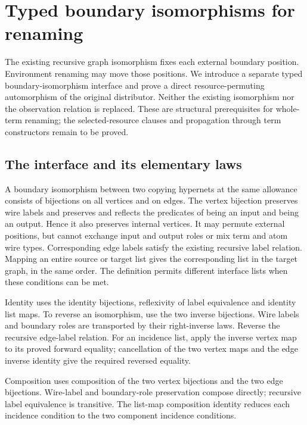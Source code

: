 \clearpage
\section{Typed boundary isomorphisms for renaming}
\label{sec:copying-boundary-iso}
The existing recursive graph isomorphism fixes each external boundary position.
Environment renaming may move those positions. We introduce a separate typed
boundary-isomorphism interface and prove a direct resource-permuting
automorphism of the original distributor. Neither the existing isomorphism nor
the observation relation is replaced. These are structural prerequisites for
whole-term renaming; the selected-resource clauses and propagation through
term constructors remain to be proved.

\subsection{The interface and its elementary laws}
A boundary isomorphism between two copying hypernets at the same allowance
consists of bijections on all vertices and on edges. The vertex bijection
preserves wire labels and preserves and reflects the predicates of being an
input and being an output. Hence it also preserves internal vertices. It may
permute external positions, but cannot exchange input and output roles or
mix term and atom wire types. Corresponding edge labels satisfy the existing
recursive label relation. Mapping an entire source or target list gives the
corresponding list in the target graph, in the same order. The definition
permits different interface lists when these conditions can be met.

Identity uses the identity bijections, reflexivity of label equivalence and
identity list maps. To reverse an isomorphism, use the two inverse bijections.
Wire labels and boundary roles are transported by their right-inverse laws.
Reverse the recursive edge-label relation. For an incidence list, apply the
inverse vertex map to its proved forward equality; cancellation of the two
vertex maps and the edge inverse identity give the required reversed equality.

Composition uses composition of the two vertex bijections and the two edge
bijections. Wire-label and boundary-role preservation compose directly;
recursive label equivalence is transitive. The list-map composition identity
reduces each incidence condition to the two component incidence conditions.

